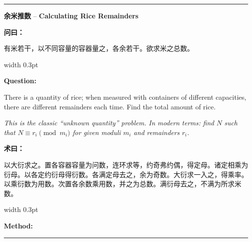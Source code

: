 \documentclass[10pt,a4paper]{article}
\newcommand{\cnlabel}[1]{\textcolor{labelcolor}{\textbf{#1}}}
\newcommand{\enlabel}[1]{\textcolor{labelcolor}{\textbf{#1}}}
\newenvironment{problemsection}{%
  \medskip\par\noindent\textcolor{rulecolor}{\rule{\textwidth}{0.4pt}}\par\smallskip%
}{\par\smallskip\noindent\textcolor{rulecolor}{\rule{\textwidth}{0.4pt}}\par\medskip}
\begin{document}
\begin{problemsection}

\noindent\begin{minipage}[t]{\textwidth}
\begin{center}
\textbf{余米推数} -- \textbf{Calculating Rice Remainders}
\end{center}
\end{minipage}

\vspace{0.3em}

\noindent\begin{minipage}[t]{0.47\textwidth}
\begin{flushleft}
\small
\cnlabel{问曰：}

有米若干，以不同容量的容器量之，各余若干。欲求米之总数。
\end{flushleft}
\end{minipage}%
\hfill\vrule width 0.3pt\hfill%
\begin{minipage}[t]{0.47\textwidth}
\begin{flushleft}
\small
\enlabel{Question:}

There is a quantity of rice; when measured with containers of different capacities, there are different remainders each time. Find the total amount of rice.

\textit{This is the classic ``unknown quantity'' problem. In modern terms: find $N$ such that $N \equiv r_i \pmod{m_i}$ for given moduli $m_i$ and remainders $r_i$.}
\end{flushleft}
\end{minipage}

\vspace{0.3em}

\noindent\begin{minipage}[t]{0.47\textwidth}
\begin{flushleft}
\small
\cnlabel{术曰：}

以大衍求之。置各容器容量为问数，连环求等，约奇弗约偶，得定母。诸定相乘为衍母。以各定约衍母得衍数。各满定母去之，余为奇数。大衍求一入之，得乘率。以乘衍数为用数。次置各余数乘用数，并之为总数。满衍母去之，不满为所求米数。
\end{flushleft}
\end{minipage}%
\hfill\vrule width 0.3pt\hfill%
\begin{minipage}[t]{0.47\textwidth}
\begin{flushleft}
\small
\enlabel{Method:}


\end{flushleft}
\end{minipage}
\end{problemsection}
\end{document}
